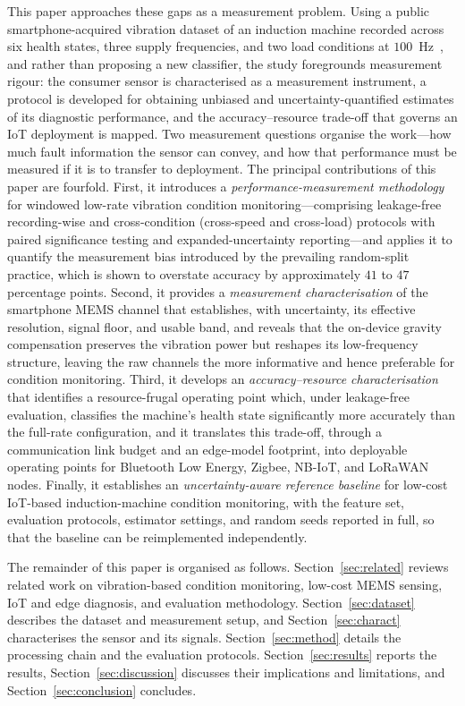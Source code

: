 This paper approaches these gaps as a measurement problem. Using a public
smartphone-acquired vibration dataset of an induction machine recorded across six
health states, three supply frequencies, and two load conditions at
$100$~Hz~\cite{ertargin2026smartphone, ertargin2026dataset}, and rather than
proposing a new classifier, the study foregrounds measurement rigour: the
consumer sensor is characterised as a measurement instrument, a protocol is
developed for obtaining unbiased and uncertainty-quantified estimates of its
diagnostic performance, and the accuracy--resource trade-off that governs an IoT
deployment is mapped. Two measurement questions organise the work---how much
fault information the sensor can convey, and how that performance must be measured
if it is to transfer to deployment. The principal contributions of this paper are
fourfold. First, it introduces a \emph{performance-measurement methodology} for
windowed low-rate vibration condition monitoring---comprising leakage-free
recording-wise and cross-condition (cross-speed and cross-load) protocols with
paired significance testing and expanded-uncertainty reporting---and applies it to
quantify the measurement bias introduced by the prevailing random-split practice,
which is shown to overstate accuracy by approximately $41$ to $47$ percentage
points. Second, it provides a \emph{measurement characterisation} of the
smartphone MEMS channel that establishes, with uncertainty, its effective
resolution, signal floor, and usable band, and reveals that the on-device gravity
compensation preserves the vibration power but reshapes its low-frequency
structure, leaving the raw channels the more informative and hence preferable for
condition monitoring. Third, it develops an
\emph{accuracy--resource characterisation} that identifies a resource-frugal
operating point which, under leakage-free evaluation, classifies the machine's
health state significantly more accurately than the full-rate configuration, and
it translates
this trade-off, through a communication link budget and an edge-model footprint,
into deployable operating points for Bluetooth Low Energy, Zigbee, NB-IoT, and
LoRaWAN nodes. Finally, it establishes an \emph{uncertainty-aware reference
baseline} for low-cost IoT-based induction-machine condition monitoring, with the
feature set, evaluation protocols, estimator settings, and random seeds reported
in full, so that the baseline can be reimplemented independently.

The remainder of this paper is organised as follows.
Section~\ref{sec:related} reviews related work on vibration-based condition
monitoring, low-cost MEMS sensing, IoT and edge diagnosis, and evaluation
methodology. Section~\ref{sec:dataset} describes the dataset and measurement
setup, and Section~\ref{sec:charact} characterises the sensor and its signals.
Section~\ref{sec:method} details the processing chain and the evaluation
protocols. Section~\ref{sec:results} reports the results,
Section~\ref{sec:discussion} discusses their implications and limitations, and
Section~\ref{sec:conclusion} concludes.
